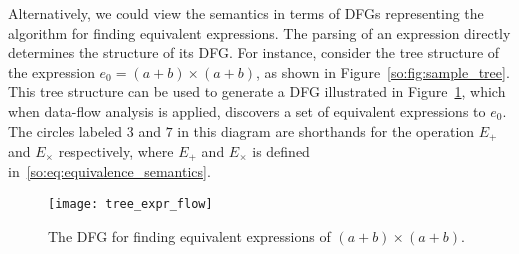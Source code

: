 Alternatively, we could view the semantics in terms of DFGs representing the
algorithm for finding equivalent expressions. The parsing of an expression
directly determines the structure of its DFG\@. For instance, consider the
tree structure of the expression $e_0 = (a + b) \times (a + b)$, as shown in
Figure~\ref{so:fig:sample_tree}. This tree structure can be used to generate
a DFG illustrated in Figure~\ref{so:fig:tree_expr_flow}, which when data-flow
analysis is applied, discovers a set of equivalent expressions to $e_0$. The
circles labeled $3$ and $7$ in this diagram are shorthands for the operation
$E_+$ and $E_\times$ respectively, where $E_+$ and $E_\times$ is defined
in~\eqref{so:eq:equivalence_semantics}.
\begin{figure}[ht]
    \centering
    \texttt{[image: tree\_expr\_flow]}
    \caption{The DFG for finding equivalent expressions of
    $(a + b) \times (a + b)$.}\label{so:fig:tree_expr_flow}
\end{figure}

